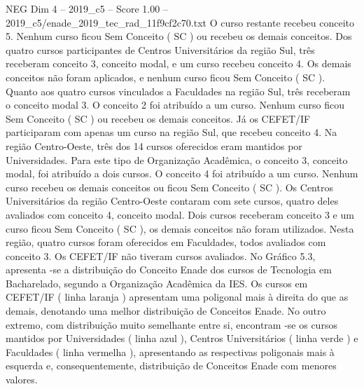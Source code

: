\begin{textsample}{NEG Dim 4 – 2019\_c5 – Score 1.00 – 2019\_c5/enade\_2019\_tec\_rad\_11f9cf2c70.txt}
O curso restante recebeu conceito 5.
Nenhum curso ficou Sem Conceito ( SC ) ou recebeu os demais conceitos.
Dos quatro cursos participantes de Centros Universitários da região Sul, três receberam conceito 3, conceito modal, e um curso recebeu conceito 4.
Os demais conceitos não foram aplicados, e nenhum curso ficou Sem Conceito ( SC ).
Quanto aos quatro cursos vinculados a Faculdades na região Sul, três receberam o conceito modal 3.
O conceito 2 foi atribuído a um curso.
Nenhum curso ficou Sem Conceito ( SC ) ou recebeu os demais conceitos.
Já os CEFET/IF participaram com apenas um curso na região Sul, que recebeu conceito 4.
Na região Centro-Oeste, três dos 14 cursos oferecidos eram mantidos por Universidades.
Para este tipo de Organização Acadêmica, o conceito 3, conceito modal, foi atribuído a dois cursos.
O conceito 4 foi atribuído a um curso.
Nenhum curso recebeu os demais conceitos ou ficou Sem Conceito ( SC ).
Os Centros Universitários da região Centro-Oeste contaram com sete cursos, quatro deles avaliados com conceito 4, conceito modal.
Dois cursos receberam conceito 3 e um curso ficou Sem Conceito ( SC ), os demais conceitos não foram utilizados.
Nesta região, quatro cursos foram oferecidos em Faculdades, todos avaliados com conceito 3.
Os CEFET/IF não tiveram cursos avaliados.
No Gráfico 5.3, apresenta -se a distribuição do Conceito Enade dos cursos de Tecnologia em Bacharelado, segundo a Organização Acadêmica da IES.
Os cursos em CEFET/IF ( linha laranja ) apresentam uma poligonal mais à direita do que as demais, denotando uma melhor distribuição de Conceitos Enade.
No outro extremo, com distribuição muito semelhante entre si, encontram -se os cursos mantidos por Universidades ( linha azul ), Centros Universitários ( linha verde ) e Faculdades ( linha vermelha ), apresentando as respectivas poligonais mais à esquerda e, consequentemente, distribuição de Conceitos Enade com menores valores.

\end{textsample}
